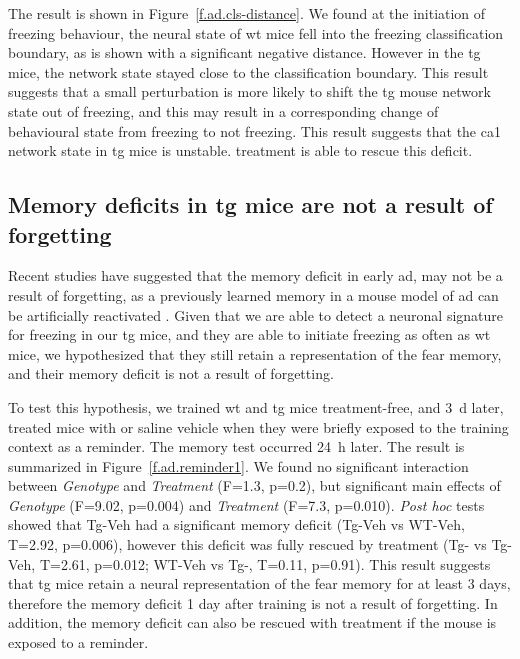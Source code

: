 The result is shown in Figure~\ref{f.ad.cls-distance}. We found at the initiation of freezing behaviour, the neural state of \gls{wt} mice fell into the freezing classification boundary, as is shown with a significant negative distance. However in the \gls{tg} mice, the network state stayed close to the classification boundary. This result suggests that a small perturbation is more likely to shift the \gls{tg} mouse network state out of freezing, and this may result in a corresponding change of behavioural state from freezing to not freezing. This result suggests that the \gls{ca1} network state in \gls{tg} mice is unstable. \tglu{} treatment is able to rescue this deficit. 

\subsection{Memory deficits in \Gls{tg} mice are not a result of forgetting}

Recent studies have suggested that the memory deficit in early \gls{ad}, may not be a result of forgetting, as a previously learned memory in a mouse model of \gls{ad} can be artificially reactivated \citep{roy16}. Given that we are able to detect a neuronal signature for freezing in our \gls{tg} mice, and they are able to initiate freezing as often as \gls{wt} mice, we hypothesized that they still retain a representation of the fear memory, and their memory deficit is not a result of forgetting.

To test this hypothesis, we trained \gls{wt} and \gls{tg} mice treatment-free, and \SI{3}{\day} later, treated mice with \tglu{} or saline vehicle when they were briefly exposed to the training context as a reminder. The memory test occurred \SI{24}{\hour} later. The result is summarized in Figure~\ref{f.ad.reminder1}. We found no significant interaction between \textit{Genotype} and \textit{Treatment} (F=1.3, p=0.2), but significant main effects of \textit{Genotype} (F=9.02, p=0.004) and \textit{Treatment} (F=7.3, p=0.010). \textit{Post hoc} tests showed that Tg-Veh had a significant memory deficit (Tg-Veh vs WT-Veh, T=2.92, p=0.006), however this deficit was fully rescued by \tglu{} treatment (Tg-\glu{} vs Tg-Veh, T=2.61, p=0.012; WT-Veh vs Tg-\glu{}, T=0.11, p=0.91). This result suggests that \gls{tg} mice retain a neural representation of the fear memory for at least 3 days, therefore the memory deficit 1 day after training is not a result of forgetting. In addition, the memory deficit can also be rescued with \tglu{} treatment if the mouse is exposed to a reminder.

